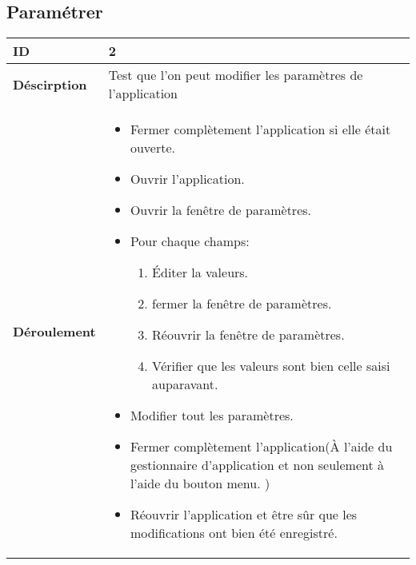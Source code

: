 	\subsection{Paramétrer}
			 \begin{longtable}{m{4cm}|p{10cm}|}
			 \textbf{ ID} & 2 \\
			 \hline \textbf{Déscirption} & Test que l'on peut modifier les paramètres de l'application\\
			 \hline \textbf{Déroulement} &
				 \begin{itemize}
					 \item Fermer complètement l'application si elle était ouverte.
					 \item Ouvrir l'application.
					 \item  Ouvrir la fenêtre de paramètres.
					 \item  Pour chaque champs:
						 \begin{enumerate}
						 	\item Éditer la valeurs.
						 	\item fermer la fenêtre de paramètres.
						 	\item Réouvrir la fenêtre de paramètres.
						 	\item Vérifier que les valeurs sont bien celle saisi auparavant.
						 \end{enumerate}
					 \item Modifier tout les paramètres.
					 \item Fermer complètement l'application(À l'aide du gestionnaire d'application et non seulement à l'aide du bouton menu. )
					 \item Réouvrir l'application et être sûr que les modifications ont bien été enregistré.
				 \end{itemize}
			 \\
		 \end{longtable} 
